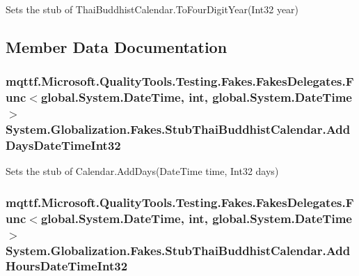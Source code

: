 Sets the stub of Thai\-Buddhist\-Calendar.\-To\-Four\-Digit\-Year(\-Int32 year)



\subsection{Member Data Documentation}
\hypertarget{class_system_1_1_globalization_1_1_fakes_1_1_stub_thai_buddhist_calendar_a42997e76e013d789b9133991bd77323d}{
\subsubsection[{Add\-Days\-Date\-Time\-Int32}]{\setlength{\rightskip}{0pt plus 5cm}mqttf.\-Microsoft.\-Quality\-Tools.\-Testing.\-Fakes.\-Fakes\-Delegates.\-Func$<$global.\-System.\-Date\-Time, int, global.\-System.\-Date\-Time$>$ System.\-Globalization.\-Fakes.\-Stub\-Thai\-Buddhist\-Calendar.\-Add\-Days\-Date\-Time\-Int32}}\label{class_system_1_1_globalization_1_1_fakes_1_1_stub_thai_buddhist_calendar_a42997e76e013d789b9133991bd77323d}


Sets the stub of Calendar.\-Add\-Days(\-Date\-Time time, Int32 days)

\hypertarget{class_system_1_1_globalization_1_1_fakes_1_1_stub_thai_buddhist_calendar_ac53d4ba1201a7ae8a2b13838fec36c07}{
\subsubsection[{Add\-Hours\-Date\-Time\-Int32}]{\setlength{\rightskip}{0pt plus 5cm}mqttf.\-Microsoft.\-Quality\-Tools.\-Testing.\-Fakes.\-Fakes\-Delegates.\-Func$<$global.\-System.\-Date\-Time, int, global.\-System.\-Date\-Time$>$ System.\-Globalization.\-Fakes.\-Stub\-Thai\-Buddhist\-Calendar.\-Add\-Hours\-Date\-Time\-Int32}}\label{class_system_1_1_globalization_1_1_fakes_1_1_stub_thai_buddhist_calendar_ac53d4ba1201a7ae8a2b13838fec36c07}


